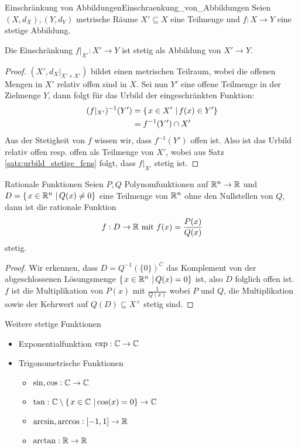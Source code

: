 \begin{satz}{Einschränkung von Abbildungen}{Einschraenkung_von_Abbildungen}
Seien $(X, d_X), (Y, d_Y)$ metrische Räume $X' \subseteq X$ eine Teilmenge und $f: X \to Y$ eine stetige Abbildung.

Die Einschränkung $f\vert_{X'} : X' \to Y$ ist stetig als Abbildung von $X' \to Y$.
\end{satz}
\begin{proof} $(X', d_X\vert_{X' \times X'})$ bildet einen metrischen Teilraum, wobei die offenen Mengen in $X'$ relativ offen sind in $X$. Sei nun $Y'$ eine offene Teilmenge in der Zielmenge $Y$, dann folgt für das Urbild der eingeschränkten Funktion:
\begin{align*}
    (f\vert_{X'})^{-1}(Y') &= \left\{\left.x \in X' \ \right| f(x) \in Y' \right\}\\
    &= f^{-1}(Y') \cap X'
\end{align*}
Aus der Stetigkeit von $f$ wissen wir, dass $f^{-1}(Y')$ offen ist. Also ist das Urbild relativ offen resp. offen als Teilmenge von $X'$, wobei aus Satz \ref{satz:urbild_stetige_fcns} folgt, dass $f\vert_{X'}$ stetig ist.
\end{proof}

\begin{lemma}{Rationale Funktionen}{}
Seien $P,Q$ Polynomfunktionen auf $\mathbb{R}^n \to \mathbb{R}$ und $D = \left\{\left.x \in \mathbb{R}^n \ \right| Q(x) \neq 0 \right\}$ eine Teilmenge von $\mathbb{R}^n$ ohne den Nullstellen von $Q$, dann ist die rationale Funktion
$$f: D \to \mathbb{R}\text{ mit }f(x) = \frac{P(x)}{Q(x)}$$ stetig.
\end{lemma}
\begin{proof}
Wir erkennen, dass $D = Q^{-1}(\{0\})^C$ das Komplement von der abgeschlossenen Lösungsmenge $\left\{\left.x \in \mathbb{R}^n \ \right| Q(x) = 0 \right\}$ ist, also $D$ folglich offen ist. $f$ ist die Multiplikation von $P(x)$ mit $\frac{1}{Q(x)}$ wobei $P$ und $Q$, die Multiplikation sowie der Kehrwert auf $Q(D) \subseteq X^\times$ stetig sind.
\end{proof} 

\begin{lemma}{Weitere stetige Funktionen}{}
\begin{itemize}
    \item Exponentialfunktion $\exp: \mathbb{C} \to \mathbb{C}$
    \item Trigonometrische Funktionen 
    \begin{itemize}
        \item $\sin, \cos: \mathbb{C} \to \mathbb{C}$
        \item $\tan: \mathbb{C} \setminus \left\{\left.x \in \mathbb{C} \ \right| \cos(x) = 0 \right\} \to \mathbb{C}$
        \item $\arcsin, \arccos: [-1, 1] \to \mathbb{R}$
        \item $\arctan: \mathbb{R} \to \mathbb{R}$
    \end{itemize}
\end{itemize}
\end{lemma}

